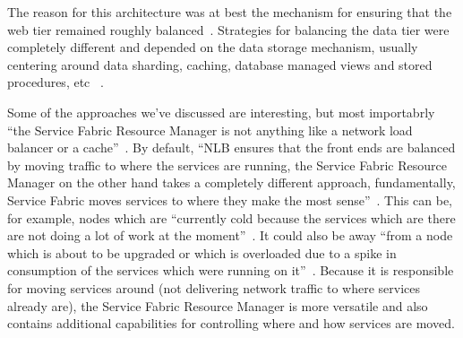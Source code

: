 The reason for this architecture was at best the mechanism for
ensuring that the web tier remained roughly
balanced~\cite{hid-sp18-501-fig2and3}.  Strategies for balancing the
data tier were completely different and depended on the data storage
mechanism, usually centering around data sharding, caching, database
managed views and stored procedures, etc
~\cite{hid-sp18-501-fig2and3}.

Some of the approaches we've discussed are interesting, but most 
importabrly
``the Service Fabric
Resource Manager is not anything like a network load balancer or a
cache''~\cite{hid-sp18-501-fig2and3}. By default, ``NLB ensures 
that the front
ends are balanced by moving traffic to where the services are running,
the Service Fabric Resource Manager on the other hand takes a completely 
different approach, 
fundamentally, Service Fabric moves services to where they make the
most sense''~\cite{hid-sp18-501-fig2and3}. This can be, for example,
nodes which are ``currently cold because the services which are there
are not doing a lot of work at the moment''~\cite{hid-sp18-501-fig2and3}.
It could also be away ``from a node which is about to be upgraded or
which is overloaded due to a spike in consumption of the services
which were running on it''~\cite{hid-sp18-501-fig2and3}. Because it is
responsible for moving services around (not delivering network traffic
to where services already are), the Service Fabric Resource Manager is
more versatile and also contains additional capabilities for
controlling where and how services are moved.

